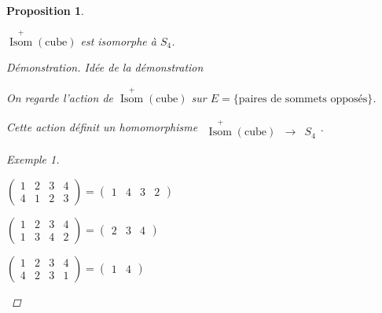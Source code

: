 \documentclass{report}
\newtheorem*{prop}{Proposition}
\theoremstyle{definition}
\theoremstyle{remark}
\newtheorem*{exem}{Exemple}
\newenvironment*{subsubproof}[1][D\'emonstration]
{
\begin{proof}[#1]
}
{
	\renewcommand{\qedsymbol}{$\#$}
\end{proof}
\renewcommand{\qedsymbol}{$\blacksquare$}
}
\begin{document}
	\begin{prop}~

		$\overset{+}{\operatorname{Isom}}(\mathrm{cube})$ est isomorphe \`a $S_4$.
		\begin{subsubproof}{Id\'ee de la d\'emonstration}~

			On regarde l'action de $\overset{+}{\operatorname{Isom}}(\mathrm{cube})$ sur $E = \{\text{paires de sommets oppos\'es}\}$.

			Cette action d\'efinit un homomorphisme $\begin{array}{rcl}
				\overset{+}{\operatorname{Isom}}(\mathrm{cube})&\to&S_4
			\end{array}$.
			\begin{exem}~

				\begin{ulist}
					\item $\begin{pmatrix}
						1&2&3&4\\
						4&1&2&3
					\end{pmatrix} = \begin{pmatrix}
						1&4&3&2
					\end{pmatrix}$
					\item $\begin{pmatrix}
						1&2&3&4\\
						1&3&4&2
					\end{pmatrix} = \begin{pmatrix}
						2&3&4
					\end{pmatrix}$
					\item $\begin{pmatrix}
						1&2&3&4\\
						4&2&3&1
					\end{pmatrix} = \begin{pmatrix}
						1&4
					\end{pmatrix}$
				\end{ulist}
				\begin{figure}[h]
					\centering
\end{figure}
\end{exem}
\end{subsubproof}
\end{prop}
\end{document}
